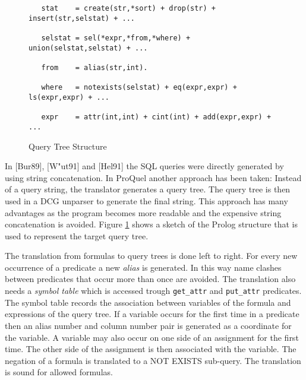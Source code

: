 \begin{figure}
{\small
\begin{verbatim}
   stat    = create(str,*sort) + drop(str) + insert(str,selstat) + ...

   selstat = sel(*expr,*from,*where) + union(selstat,selstat) + ...

   from    = alias(str,int).

   where   = notexists(selstat) + eq(expr,expr) + ls(expr,expr) + ...

   expr    = attr(int,int) + cint(int) + add(expr,expr) + ...
\end{verbatim}
}
\caption{Query Tree Structure}
\label{figqtree}
\end{figure}

In [Bur89], [W"ut91] and [Hel91] the SQL queries were directly generated by using string
concatenation. In ProQuel another approach has been taken: Instead of a query string, the
translator generates a query tree. The query tree is then used in a DCG unparser to
generate the final string. This approach has many advantages as the program becomes more
readable and the expensive string concatenation is avoided. Figure \ref{figqtree} shows
a sketch of the Prolog structure that is used to represent the target query tree.

The translation from formulas to query trees is done left to right. For every new occurrence
of a predicate a new {\em alias} is generated. In this way name clashes between predicates that 
occur more than once are avoided. The translation also needs a {\em symbol table} which is
accessed trough \verb.get_attr. and \verb.put_attr. predicates. The symbol table records the 
association between variables of the formula and expressions of the query tree. If a variable 
occurs for the first time in a predicate then an alias number and column number pair is generated 
as a coordinate for the variable. A variable may also occur on one side of an assignment for the 
first time. The other side of the assignment is then associated with the variable. The negation 
of a formula is translated to a NOT EXISTS sub-query. The translation is sound for allowed 
formulas.

